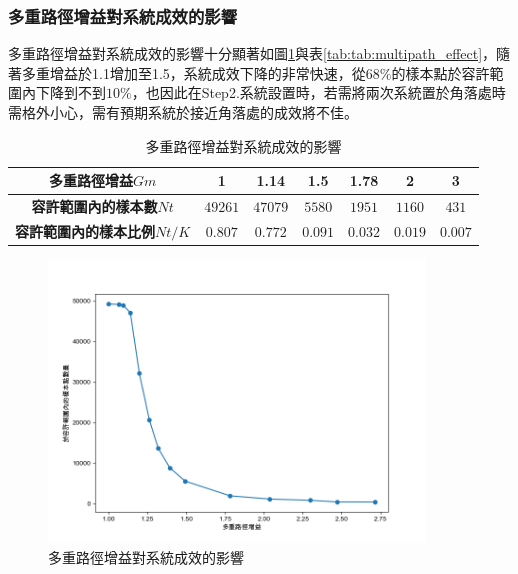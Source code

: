     \subsubsection{多重路徑增益對系統成效的影響}
    \label{chp:multipath_bandwidth}

    多重路徑增益對系統成效的影響十分顯著如圖\ref{pic:multipath_effect}與表\ref{tab:tab:multipath_effect}，隨著多重增益於1.1增加至1.5，系統成效下降的非常快速，從$68\%$的樣本點於容許範圍內下降到不到$10\%$，也因此在Step2.系統設置時，若需將兩次系統置於角落處時需格外小心，需有預期系統於接近角落處的成效將不佳。



    \begin{table}[htpb]
        \begin{center}
          \caption{多重路徑增益對系統成效的影響}
          \label{tab:multipath_effect}
          \begin{tabular}{|c||c|c|c|c|c|c|} %
            \hline  
           \textbf{多重路徑增益$Gm$} &
           1&
           1.14&
           1.5&
           1.78&
           2&
           3
           \\\hline\hline

           \textbf{容許範圍內的樣本數$Nt$} &
           $49261$&
           $47079$&
           $5580$&
           $1951$&
           $1160$&
           $431$
           \\\hline

           \textbf{容許範圍內的樣本比例$Nt/K$} &
           $0.807$&
           $0.772$&
           $0.091$&
           $0.032$&
           $0.019$&
           $0.007$
           \\\hline
         \end{tabular}
       \end{center}
     \end{table}

     \begin{figure}[htpb]
        \centering
        \includegraphics[width=10cm]{ch4pic/multipath_effect.png}
        \caption{多重路徑增益對系統成效的影響}
        \label{pic:multipath_effect}
    \end{figure}



